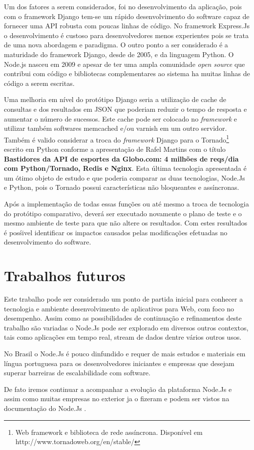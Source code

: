   Um dos fatores a serem considerados, foi no desenvolvimento da aplicação, pois com o framework Django tem-se um rápido 
  desenvolvimento do software capaz de fornecer uma API robusta com poucas linhas de código. No framework Express.Js o desenvolvimento
  é custoso para desenvolvedores menos experientes pois se trata de uma nova abordagem e paradigma. 
  O outro ponto a ser considerado é a maturidade do framework Django, desde de 2005, e da linguagem Python. O Node.js
  nasceu em 2009 e apesar de ter uma ampla comunidade \textit{open source} que contribui com código e bibliotecas complementares
  ao sistema ha muitas linhas de código a serem escritas. 
  
  Uma melhoria em nível do protótipo Django seria a utilização de cache de consultas e dos resultados em JSON que poderiam
  reduzir o tempo de resposta e aumentar o número de sucessos. Este cache pode ser colocado no \textit{framework} e utilizar também
  softwares memcached e/ou varnish em um outro servidor.\cite{UsandoDjango:2013}
  Também é valido considerar a troca do \textit{framework} Django para o Tornado\footnote{Web framework e biblioteca de rede 
  assíncrona. Disponível em http://www.tornadoweb.org/en/stable/} escrito em Python conforme a apresentação de Rafel 
  Martins com o título \textbf{Bastidores da API de esportes da Globo.com: 4 milhões de reqs/dia com Python/Tornado, Redis e Nginx}.
  Esta última tecnologia apresentada é um ótimo objeto de estudo e que poderia comparar as duas tecnologias, Node.Js e Python, pois 
  o Tornado possui características não bloqueantes e assíncronas.\cite{TornadoGloboEsporte:2014}

  Após a implementação de todas essas funções ou até mesmo a troca de tecnologia do protótipo comparativo, 
  deverá ser executado novamente o plano de teste e o mesmo ambiente de teste para que não altere os resultados. Com estes
  resultados é posśivel identificar os impactos causados pelas modificações efetuadas no desenvolvimento do software.
  
\section{Trabalhos futuros}
\label{trabalhos-furutos}
  
  Este trabalho pode ser considerado um ponto de partida inicial para conhecer a tecnologia e ambiente desenvolvimento de aplicativos 
  para Web, com foco no desempenho. Assim como as possibilidades de continuação e refinamentos deste trabalho 
  são variadas o Node.Js pode ser explorado em diversos outros contextos, tais como aplicações em tempo real, stream de dados dentre 
  vários outros usos.
  
  No Brasil o Node.Js é pouco dinfundido e requer de mais estudos e materiais em língua portuguesa para os desenvolvedores iniciantes
  e empresas que desejam superar barreiras de escalabilidade com software. 
  
  De fato iremos continuar a acompanhar a evolução da plataforma Node.Js e assim como muitas empresas no exterior ja o fizeram e 
  podem ser vistos na documentação do Node.Js .
  
  

